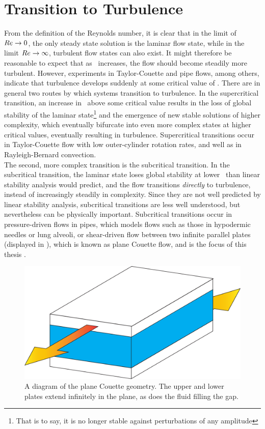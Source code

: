 \section{Transition to Turbulence}

From the definition of the Reynolds number, it is clear that in the limit of $Re \rightarrow 0$, the only steady state solution is the laminar flow state, while in the limit $Re \rightarrow \infty$, turbulent flow states can also exist. It might therefore be reasonable to expect that as \ReN~increases, the flow should become steadily more turbulent. However, experiments in Taylor-Couette and pipe flows, among others, indicate that turbulence develops suddenly at some critical value of \ReN. There are in general two routes by which systems transition to turbulence. In the supercritical transition, an increase in \ReN~above some critical value results in the loss of global stability of the laminar state\footnote{That is to say, it is no longer stable against perturbations of any amplitude} and the emergence of new stable solutions of higher complexity, which eventually bifurcate into even more complex states at higher critical values, eventually resulting in turbulence. Supercritical transitions occur in Taylor-Couette flow with low outer-cylinder rotation rates, and well as in Rayleigh-Bernard convection. \\

The second, more complex transition is the subcritical transition. In the subcritical transition, the laminar state loses global stability at lower \ReN~than linear stability analysis would predict, and the flow transitions \emph{directly} to turbulence, instead of increasingly steadily in complexity. Since they are not well predicted by linear stability analysis, subcritical transitions are less well understood, but nevertheless can be physically important. Subcritical transitions occur in pressure-driven flows in pipes, which models flows such as those in hypodermic needles or lung alveoli, or shear-driven flow between two infinite parallel plates (displayed in ), which is known as plane Couette flow, and is the focus of this thesis .
\begin{figure}
\centerline{
\includegraphics[scale=0.4]{Figs/planeCouetteDiagram}}
\caption{A diagram of the plane Couette geometry. The upper and lower plates extend infinitely in the plane, as does the fluid filling the gap.}\label{fig:planeCouette}
\end{figure}

